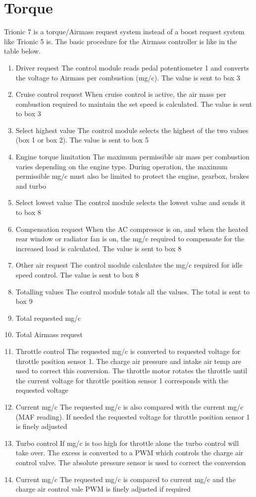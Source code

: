 \documentclass[11pt,a4paper]{book}
\begin{document}
\section{Torque}
Trionic 7 is a torque/Airmass request system instead of a boost request system like Trionic 5 is.
The basic procedure for the Airmass controller is like in the table below.
\begin{enumerate}
    \item  Driver request The control module reads pedal potentiometer 1 and converts the
voltage to Airmass per combustion (mg/c). The value is sent to box 3
\item Cruise control request When cruise control is active, the air mass per combustion required to
maintain the set speed is calculated. The value is sent to box 3
\item Select highest value The control module selects the highest of the two values (box 1 or box
2). The value is sent to box 5
\item Engine torque limitation The maximum permissible air mass per combustion varies depending
on the engine type. During operation, the maximum permissible mg/c
must also be limited to protect the engine, gearbox, brakes and turbo
\item Select lowest value The control module selects the lowest value and sends it to box 8
\item Compensation request When the AC compressor is on, and when the heated rear window or
radiator fan is on, the mg/c required to compensate for the increased
load is calculated. The value is sent to box 8
\item Other air request The control module calculates the mg/c required for idle speed control.
The value is sent to box 8
\item Totalling values The control module totals all the values. The total is sent to box 9
\item Total requested mg/c
\item Total Airmass request
\item Throttle control The requested mg/c is converted to requested voltage for throttle
position sensor 1. The charge air pressure and intake air temp are
used to correct this conversion. The throttle motor rotates the throttle
until the current voltage for throttle position sensor 1 corresponds with
the requested voltage
\item Current mg/c The requested mg/c is also compared with the current mg/c (MAF
reading). If needed the requested voltage for throttle position sensor 1
is finely adjusted
\item Turbo control If mg/c is too high for throttle alone the turbo control will take over.
The excess is converted to a PWM which controls the charge air
control valve. The absolute pressure sensor is used to correct the
conversion
\item Current mg/c The requested mg/c is compared to current mg/c and the charge air
control vale PWM is finely adjusted if required
\end{enumerate}
\end{document}
